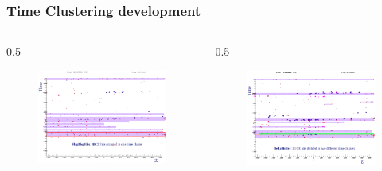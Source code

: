 \documentclass{beamer}
\begin{document}
\begin{frame}
    \frametitle{Time Clustering development}
    \vspace{-4mm}
    \begin{columns}
        \begin{column}{0.5\framewidth}
            \begin{figure}[!h]
                \centering
                \includegraphics[width =\columnwidth]{figures/png/Screenshot_20240926_095738.png}
               \end{figure}
        \end{column}
        \begin{column}{0.5\framewidth}
            \begin{figure}[!h]
                \centering
                \includegraphics[width =\columnwidth]{figures/png/Screenshot_20240926_095542.png}
               \end{figure}
        \end{column}
    \end{columns}


\end{frame}
\end{document}
